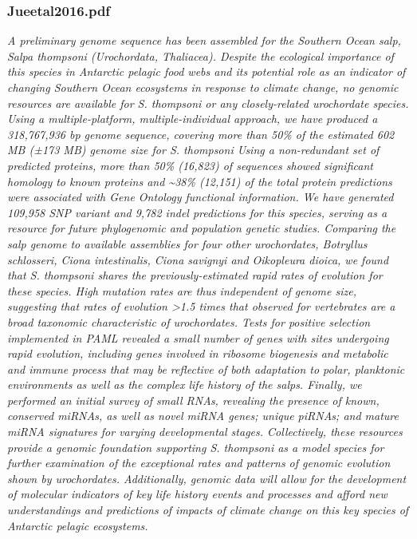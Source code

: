 \documentclass[graybox]{svmult}
\begin{document}
\subsubsection{Jueetal2016.pdf}
\cite{Jue2016,}
\textit{A preliminary genome sequence has been assembled for the Southern Ocean salp, Salpa thompsoni (Urochordata, Thaliacea). Despite the ecological importance of this species in Antarctic pelagic food webs and its potential role as an indicator of changing Southern Ocean ecosystems in response to climate change, no genomic resources are available for S. thompsoni or any closely-related urochordate species. Using a multiple-platform, multiple-individual approach, we have produced a 318,767,936 bp genome sequence, covering more than 50{\%} of the estimated 602 MB (±173 MB) genome size for S. thompsoni Using a non-redundant set of predicted proteins, more than 50{\%} (16,823) of sequences showed significant homology to known proteins and {\~{}}38{\%} (12,151) of the total protein predictions were associated with Gene Ontology functional information. We have generated 109,958 SNP variant and 9,782 indel predictions for this species, serving as a resource for future phylogenomic and population genetic studies. Comparing the salp genome to available assemblies for four other urochordates, Botryllus schlosseri, Ciona intestinalis, Ciona savignyi and Oikopleura dioica, we found that S. thompsoni shares the previously-estimated rapid rates of evolution for these species. High mutation rates are thus independent of genome size, suggesting that rates of evolution {\textgreater}1.5 times that observed for vertebrates are a broad taxonomic characteristic of urochordates. Tests for positive selection implemented in PAML revealed a small number of genes with sites undergoing rapid evolution, including genes involved in ribosome biogenesis and metabolic and immune process that may be reflective of both adaptation to polar, planktonic environments as well as the complex life history of the salps. Finally, we performed an initial survey of small RNAs, revealing the presence of known, conserved miRNAs, as well as novel miRNA genes; unique piRNAs; and mature miRNA signatures for varying developmental stages. Collectively, these resources provide a genomic foundation supporting S. thompsoni as a model species for further examination of the exceptional rates and patterns of genomic evolution shown by urochordates. Additionally, genomic data will allow for the development of molecular indicators of key life history events and processes and afford new understandings and predictions of impacts of climate change on this key species of Antarctic pelagic ecosystems.}
\end{document}
